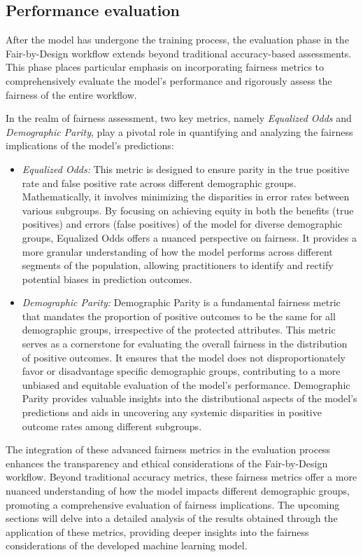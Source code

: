 \subsection{Performance evaluation}

After the model has undergone the training process, the evaluation phase in the Fair-by-Design workflow extends beyond traditional accuracy-based assessments. This phase places particular emphasis on incorporating fairness metrics to comprehensively evaluate the model's performance and rigorously assess the fairness of the entire workflow.

In the realm of fairness assessment, two key metrics, namely \emph{Equalized Odds} and \emph{Demographic Parity}, play a pivotal role in quantifying and analyzing the fairness implications of the model's predictions:

\begin{itemize}

    \item \emph{Equalized Odds:} This metric is designed to ensure parity in the true positive rate and false positive rate across different demographic groups. Mathematically, it involves minimizing the disparities in error rates between various subgroups. By focusing on achieving equity in both the benefits (true positives) and errors (false positives) of the model for diverse demographic groups, Equalized Odds offers a nuanced perspective on fairness. It provides a more granular understanding of how the model performs across different segments of the population, allowing practitioners to identify and rectify potential biases in prediction outcomes.
    
    \item \emph{Demographic Parity:} Demographic Parity is a fundamental fairness metric that mandates the proportion of positive outcomes to be the same for all demographic groups, irrespective of the protected attributes. This metric serves as a cornerstone for evaluating the overall fairness in the distribution of positive outcomes. It ensures that the model does not disproportionately favor or disadvantage specific demographic groups, contributing to a more unbiased and equitable evaluation of the model's performance. Demographic Parity provides valuable insights into the distributional aspects of the model's predictions and aids in uncovering any systemic disparities in positive outcome rates among different subgroups.

\end{itemize}
The integration of these advanced fairness metrics in the evaluation process enhances the transparency and ethical considerations of the Fair-by-Design workflow. Beyond traditional accuracy metrics, these fairness metrics offer a more nuanced understanding of how the model impacts different demographic groups, promoting a comprehensive evaluation of fairness implications. The upcoming sections will delve into a detailed analysis of the results obtained through the application of these metrics, providing deeper insights into the fairness considerations of the developed machine learning model.

